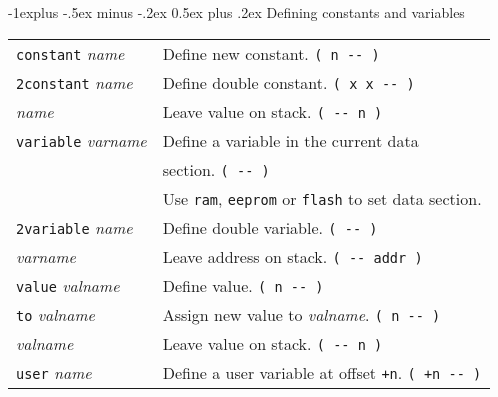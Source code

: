 \documentclass[10pt,landscape,a4paper]{article}
\makeatletter
\renewcommand{\subsection}{\@startsection{subsection}{2}{0mm}%
                                {-1explus -.5ex minus -.2ex}%
                                {0.5ex plus .2ex}%
                                {\normalfont\normalsize\bfseries}}
\makeatother
\begin{document}
\begin{multicols}{3}
\subsection{Defining constants and variables}
\begin{tabular}{@{}ll@{}}
\verb!constant! \textit{name}  & Define new constant. \verb!( n -- )! \\ 
\verb!2constant! \textit{name}  & Define double constant. \verb!( x x -- )! \\
\textit{name} & Leave value on stack. \verb!( -- n )! \\
\verb!variable! \textit{varname}  & Define a variable in the current data \\
                                  & section. \verb!( -- )! \\
                                  & Use \verb!ram!, \verb!eeprom! or \verb!flash! to set data section. \\
\verb!2variable! \textit{name}  & Define double variable. \verb!( -- )! \\
\textit{varname}  & Leave address on stack.  \verb!( -- addr )! \\
\verb!value! \textit{valname}  & Define value. \verb!( n -- )! \\
\verb!to! \textit{valname}  & Assign new value to \textit{valname}. \verb!( n -- )! \\
\textit{valname}  & Leave value on stack.  \verb!( -- n )! \\
\verb!user! \textit{name} & Define a user variable at offset \verb!+n!. \verb!( +n -- )! \\
\end{tabular}

\medskip


\end{multicols}
\end{document}
